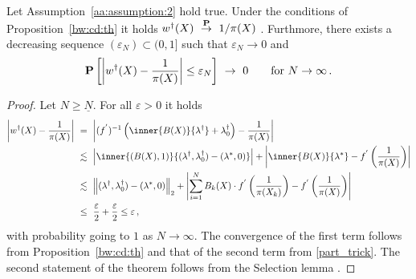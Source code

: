 \begin{ftheorem}
  \label{aa:weights:th}
  Let Assumption~\ref{aa:assumption:2} hold true.
  Under the conditions of Proposition~\ref{bw:cd:th} 
  it holds
  $w^\dagger(X)\ 
  \overset{\P}{\to}
  \ 
  1/\pi(X)
  $
  .
  Furthmore, there exists a decreasing sequence $(\varepsilon_N)\subset(0,1]$ such that $\varepsilon_N\to 0$ and 
  \begin{gather}
    \P
    \left[ 
  \left| 
  w^\dagger(X)
  -
  \frac{1}{\pi(X)}
  \right|
    \le
    \varepsilon_N
    \right]
  \  
  \to
  \  
  0
  \qquad
  \text{for}
  \ 
  N\to\infty
  \,.
  \end{gather}
\end{ftheorem}
\begin{proof}
  Let
  $N\ge\underline{N}$.
  For all $\varepsilon>0$ it holds
\begin{align}
  \begin{split}
  \left| 
  w^\dagger(X)
  -
  \frac{1}{\pi(X)}
  \right|
  &
  \ 
  =
  \ 
  \left| 
  (f^{'})^{-1}
  \left( 
    \inner{B(X)}
    {\lambda^\dagger}
    +
    \lambda_0^\dagger
  \right)
  -
  \frac{1}{\pi(X)}
  \right|
  \\
  &
  \ 
  \lesssim
  \ 
  \left| 
    \inner{(B(X),1)}
    {
      (\lambda^\dagger,\lambda_0^\dagger)
      -
      (\lambda^*,0)
    }
  \right|
  +
  \left| 
    \inner{B(X)}
    {
      \lambda^*
      }
    -
    f^{'}
    \left( 
  \frac{1}{\pi(X)}
    \right)
  \right|
  \\
  &
  \ 
  \lesssim
  \ 
  \norm{
      (\lambda^\dagger,\lambda_0^\dagger)
      -
      (\lambda^*,0)
}_2
  +
  \left| 
  \sum_{i=1}^{N} 
  B_k(X)
  \cdot
    f^{'}
    \left( 
  \frac{1}{\pi(X_k)}
    \right)
    -
    f^{'}
    \left( 
  \frac{1}{\pi(X)}
    \right)
  \right|
  \\
  &
  \ 
  \le
  \ 
  \frac{\varepsilon}{2}
+
  \frac{\varepsilon}{2}
  \le
  \varepsilon
  \,,
\end{split}
\end{align}
with probability going to $1$ as $N\to\infty$.
The convergence of the first term follows from Proposition~\ref{bw:cd:th} and that of the second term from \eqref{part_trick}.
The second statement of the theorem follows from the Selection lemma
\cite[A.1.4.]{Steinwart2008}.
\end{proof}
